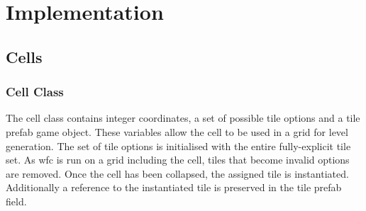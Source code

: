 \chapter{Implementation}
\section{Cells}
\subsection{Cell Class}\label{sec:cellClass}
The cell class contains integer coordinates, a set of possible tile options and a tile prefab game object. These variables allow the cell to be used in a grid for level generation. The set of tile options is initialised with the entire fully-explicit tile set. As \acrshort{wfc} is run on a grid including the cell, tiles that become invalid options are removed. Once the cell has been collapsed, the assigned tile is instantiated. Additionally a reference to the instantiated tile is preserved in the tile prefab field.

